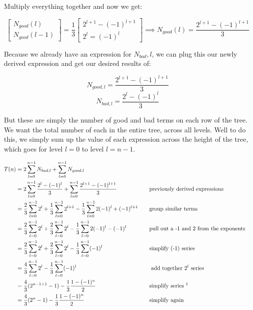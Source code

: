 \documentclass[11pt, letterpaper]{article}
\begin{document}
\begin{enumerate}[label=(\alph*)]
Multiply everything together and now we get:

\[
\begin{bmatrix}
N_{good}(l) \\
N_{good}(l - 1)
\end{bmatrix}
=
\frac{1}{3}
\begin{bmatrix}
2^{l + 1} - (-1)^{l + 1} \\
2^l = (-1)^l
\end{bmatrix}
\implies
N_{good}(l) = \frac{2^{l + 1} - (-1)^{l + 1}}{3}
\]

\pagebreak

Because we already have an expression for $N_{bad}, l$, we can plug this our newly derived expression and get our desired results of:

$$ N_{good, l} = \frac{2^{l + 1} - (-1)^{l + 1}}{3} $$
$$ N_{bad, l} = \frac{2^l - (-1)^l}{3} $$

\quad But these are simply the number of good and bad terms on each row of the tree. We want the total number of each in the entire tree, across all levels. Well to do this, we simply sum up the value of each expression across the height of the tree, which goes for level $l = 0$ to level $l = n-1$. 

\begin{alignat*}{2}
T(n) &= 2 \sum_{l = 0}^{n - 1}N_{bad, l} + \sum_{l = 0}^{n - 1} N_{good, l} \\
&= 2\sum_{l = 0}^{n - 1} \frac{2^l - (-1)^l}{3} + \sum_{l = 0}^{n - 1} \frac{2^{l + 1} - (-1)^{l + 1}}{3} &\quad &\text{previously derived expressions} \\
&= \frac{2}{3} \sum_{l = 0}^{n - 1} 2^l + \frac{1}{3} \sum_{l=0}^{n - 1} 2^{l + 1} - \frac{1}{3} \sum_{l = 0}^{n - 1} 2(-1)^l + (-1)^{l + 1} &\quad &\text{group similar terms} \\
&= \frac{2}{3} \sum_{l = 0}^{n - 1} 2^l + \frac{2}{3} \sum_{l=0}^{n - 1} 2^{l} - \frac{1}{3} \sum_{l = 0}^{n - 1} 2(-1)^l - (-1)^{l} &\quad &\text{pull out a -1 and 2 from the exponents} \\
&= \frac{2}{3} \sum_{l = 0}^{n - 1} 2^l + \frac{2}{3} \sum_{l=0}^{n - 1} 2^{l} - \frac{1}{3} \sum_{l = 0}^{n - 1} (-1)^l &\quad &\text{simplify (-1) series} \\
&= \frac{4}{3} \sum_{l = 0}^{n - 1} 2^l - \frac{1}{3} \sum_{l = 0}^{n - 1} (-1)^l &\quad &\text{ add together $2^l$ series}\\
&= \frac{4}{3} (2^{n - 1 + 1} - 1) - \frac{1}{3}\frac{1 - (-1)^n}{2} &\quad &\text{simplify series \footnotemark} \\
&= \frac{4}{3} (2^{n} - 1) - \frac{1}{3}\frac{1 - (-1)^n}{2} &\quad &\text{simplify again}
\end{alignat*}


\end{enumerate}
\end{document}
